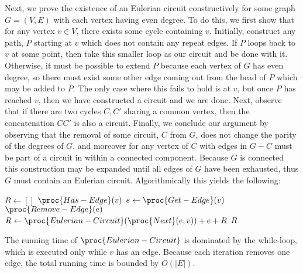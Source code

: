 \documentclass{article}
\begin{document}
Next, we prove the existence of an Eulerian circuit constructively for some graph $G=(V,E)$ with each vertex having even degree.  To do this, we first show that for any vertex $v \in V$, there exists some cycle containing $v$.  Initially, construct any path, $P$ starting at $v$ which does not contain any repeat edges.  If $P$ loops back to $v$ at some point, then take this smaller loop as our circuit and be done with it.  Otherwise, it must be possible to extend $P$ because each vertex of $G$ has even degree, so there must exist some other edge coming out from the head of $P$ which may be added to $P$.  The only case where this fails to hold is at $v$, but once $P$ has reached $v$, then we have constructed a circuit and we are done.  Next, observe that if there are two cycles $C,C'$ sharing a common vertex, then the concatenation $CC'$ is also a circuit.  Finally, we conclude our argument by observing that the removal of some circuit, $C$ from $G$, does not change the parity of the degrees of $G$, and moreover for any vertex of $C$ with edges in $G-C$ must be part of a circuit in within a connected component.  Because $G$ is connected this construction may be expanded until all edges of $G$ have been exhausted, thus $G$ must contain an Eulerian circuit.  Algorithmically this yields the following:

\begin{codebox}
\li $R \gets []$
\li \While $\proc{Has-Edge}(v)$
\li		\Do
\li		$e \gets \proc{Get-Edge}(v)$
\li		$\proc{Remove-Edge}(e)$
\li		$R \gets \proc{Eulerian-Circuit}(\proc{Next}(e,v)) + e + R$
		\End
\li	\Return $R$
\end{codebox}

The running time of $\proc{Eulerian-Circuit}$ is dominated by the while-loop, which is executed only while $v$ has an edge.  Because each iteration removes one edge, the total running time is bounded by $O(|E|)$.
\end{document}
